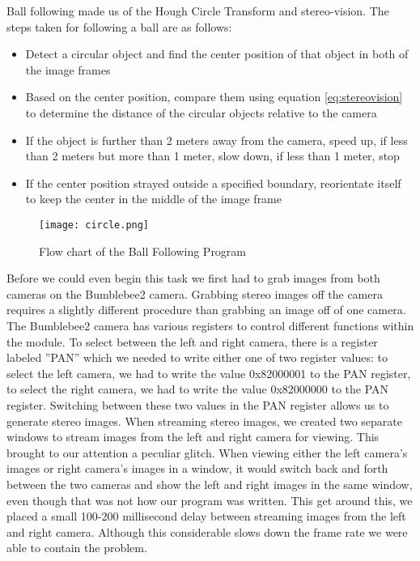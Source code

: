 \documentclass[12pt]{article}
\begin{document}
Ball following made us of the Hough Circle Transform and stereo-vision. The steps taken for following a ball are as follows:
\begin{itemize}
	\item Detect a circular object and find the center position of that object in both of the image frames
	\item Based on the center position, compare them using equation \ref{eq:stereovision} to determine the distance of the circular objects relative to the camera 
	\item If the object is further than 2 meters away from the camera, speed up, if less than 2 meters but more than 1 meter, slow down, if less than 1 meter, stop
	\item If the center position strayed outside a specified boundary, reorientate itself to keep the center in the middle of the image frame
\end{itemize}

\begin{figure}[htp!]
	\begin{center}
		\texttt{[image: circle.png]}
		\caption{Flow chart of the Ball Following Program}
	\end{center}
\end{figure}

Before we could even begin this task we first had to grab images from both cameras on the Bumblebee2 camera. Grabbing stereo images off the camera requires a slightly different procedure than grabbing an image off of one camera. The Bumblebee2 camera has various registers to control different functions within the module. To select between the left and right camera, there is a register labeled ”PAN” which we needed to write either one of two register values: to select the left camera, we had to write the value 0x82000001 to the PAN register, to select the right camera, we had to write the value 0x82000000 to the PAN register. Switching between these two values in the PAN register allows us to generate stereo images. When streaming stereo images, we created two separate windows to stream images from the left and right camera for viewing. This brought to our attention a peculiar glitch. When viewing either the left camera's images or right camera's images in a window, it would switch back and forth between the two cameras and show the left and right images in the same window, even though that was not how our program was written. This get around this, we placed a small 100-200 millisecond delay between streaming images from the left and right camera. Although this considerable slows down the frame rate we were able to contain the problem. 
\end{document}
